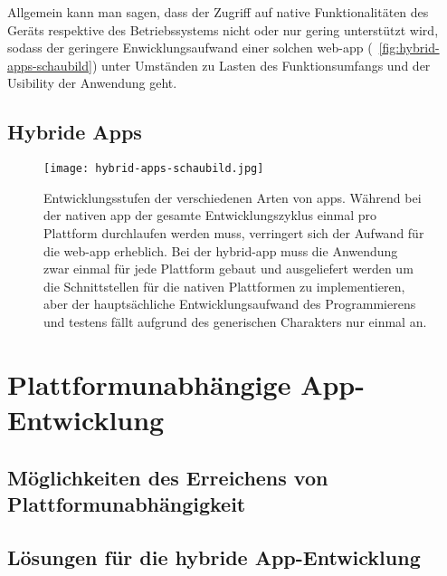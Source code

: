 Allgemein kann man sagen, dass der Zugriff auf native Funktionalitäten des Geräts respektive des Betriebssystems nicht oder nur gering unterstützt wird, sodass der geringere Enwicklungsaufwand einer solchen \gls{web-app} (\seename\  \autoref{fig:hybrid-apps-schaubild}) unter Umständen zu Lasten des Funktionsumfangs und der Usibility der Anwendung geht.

\subsection{Hybride Apps}







\begin{figure}
\centering
\texttt{[image: hybrid-apps-schaubild.jpg]}
\caption[Schaubild Hybrid Apps]{Entwicklungsstufen der verschiedenen Arten von \glspl{app}. Während bei der nativen \gls{app} der gesamte Entwicklungszyklus einmal pro Plattform durchlaufen werden muss, verringert sich der Aufwand für die \gls{web-app} erheblich. Bei der \gls{hybrid-app} muss die Anwendung zwar einmal für jede Plattform gebaut und ausgeliefert werden um die Schnittstellen für die nativen Plattformen zu implementieren, aber der hauptsächliche Entwicklungsaufwand des Programmierens und testens fällt aufgrund des generischen Charakters nur einmal an.}
\label{fig:hybrid-apps-schaubild}
\end{figure}

\section{Plattformunabhängige App-Entwicklung}

\subsection{Möglichkeiten des Erreichens von Plattformunabhängigkeit}
\subsection{Lösungen für die hybride App-Entwicklung}

